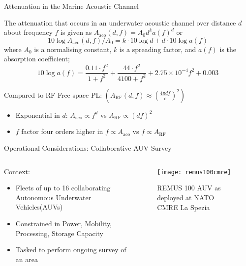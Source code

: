 \documentclass{beamer}
\begin{document}
\begin{frame}{Attenuation in the Marine Acoustic Channel}

  The attenuation that occurs in an underwater acoustic channel over distance $d$ about frequency $f$ is given as $A_{\text{aco}}(d,f) = A_0d^ka(f)^d$ or
  \begin{equation}
    \label{eq:acoattenuationdb}
    10 \log A_{\text{aco}}(d,f)/A_0 = k \cdot 10 \log d + d \cdot 10 \log a(f)
  \end{equation}
  where $A_0$ is a normalising constant, $k$ is a spreading factor, and $a(f)$ is the absorption coefficient\autocite{Stefanov2011};
  \begin{equation}
    \label{eq:thorp}
    10 \log a(f) = \frac{0.11 \cdot f^2}{1+f^2} + \frac{44\cdot f^2}{4100+f^2}+ 2.75\times10^{-4} f^2 + 0.003
  \end{equation}

  \pause

  Compared to RF Free space PL: $(A_{\text{RF}}(d,f) \approx \left( \frac{4\pi d f}{c} \right)^2)$
  \begin{itemize}
    \item \alert{Exponential} in $d$: $A_{\text{aco}} \propto f^{d}$ vs $A_{\text{RF}} \propto (df)^2$
    \item $f$ factor \alert{four orders higher} in $f\propto A_{\text{aco}}$ vs $f\propto A_{\text{RF}}$

  \end{itemize}
  
\end{frame}
\begin{frame}{Operational Considerations: Collaborative AUV Survey}
  \begin{columns}
    \begin{column}{0.5\textwidth}
      Context:
      \begin{itemize}
        \item Fleets of up to 16 collaborating Autonomous Underwater Vehicles(AUVs)
        \item Constrained in Power, Mobility, Processing, Storage Capacity
        \item Tasked to perform ongoing survey of an area
      \end{itemize}

    \end{column}
    \begin{column}{0.5\textwidth}
      \begin{figure}[h]
        \begin{center}
          \texttt{[image: remus100cmre]}
        \end{center}
        \caption{REMUS 100 AUV as deployed at NATO CMRE La Spezia}
        \label{fig:remus100cmre}
      \end{figure}
      
    \end{column}
  \end{columns}
\end{frame}
\end{document}
